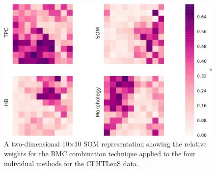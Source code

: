 \begin{figure}[htp]
  \centering
  \includegraphics[width=0.8\linewidth]{figures/weights.pdf}
  \caption{A two-dimensional 10$\times$10 SOM representation
           showing the relative weights for the BMC combination technique
           applied to the four individual methods for the CFHTLenS data.}
  \label{fig:weights}
\end{figure}


